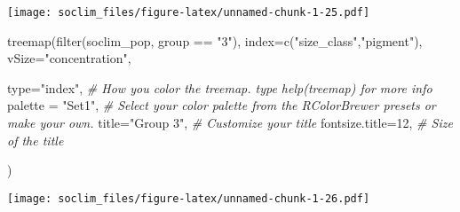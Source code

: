 \documentclass[
]{article}
\newenvironment{Shaded}{\begin{snugshade}}{\end{snugshade}}
\newcommand{\AttributeTok}[1]{\textcolor[rgb]{0.77,0.63,0.00}{#1}}
\newcommand{\CommentTok}[1]{\textcolor[rgb]{0.56,0.35,0.01}{\textit{#1}}}
\newcommand{\DecValTok}[1]{\textcolor[rgb]{0.00,0.00,0.81}{#1}}
\newcommand{\FunctionTok}[1]{\textcolor[rgb]{0.00,0.00,0.00}{#1}}
\newcommand{\NormalTok}[1]{#1}
\newcommand{\SpecialCharTok}[1]{\textcolor[rgb]{0.00,0.00,0.00}{#1}}
\newcommand{\StringTok}[1]{\textcolor[rgb]{0.31,0.60,0.02}{#1}}
\begin{document}
\texttt{[image: soclim\_files/figure-latex/unnamed-chunk-1-25.pdf]}

\begin{Shaded}
\begin{Highlighting}[]
\FunctionTok{treemap}\NormalTok{(}\FunctionTok{filter}\NormalTok{(soclim\_pop, group }\SpecialCharTok{==} \StringTok{"3"}\NormalTok{), }\AttributeTok{index=}\FunctionTok{c}\NormalTok{(}\StringTok{"size\_class"}\NormalTok{,}\StringTok{"pigment"}\NormalTok{), }\AttributeTok{vSize=}\StringTok{"concentration"}\NormalTok{,}
        
        \AttributeTok{type=}\StringTok{"index"}\NormalTok{,                            }\CommentTok{\# How you color the treemap. type help(treemap) for more info}
        \AttributeTok{palette =} \StringTok{"Set1"}\NormalTok{,                        }\CommentTok{\# Select your color palette from the RColorBrewer presets or make your own.}
        \AttributeTok{title=}\StringTok{"Group 3"}\NormalTok{,                      }\CommentTok{\# Customize your title}
        \AttributeTok{fontsize.title=}\DecValTok{12}\NormalTok{,                       }\CommentTok{\# Size of the title}
        
\NormalTok{) }
\end{Highlighting}
\end{Shaded}

\texttt{[image: soclim\_files/figure-latex/unnamed-chunk-1-26.pdf]}
\end{document}
